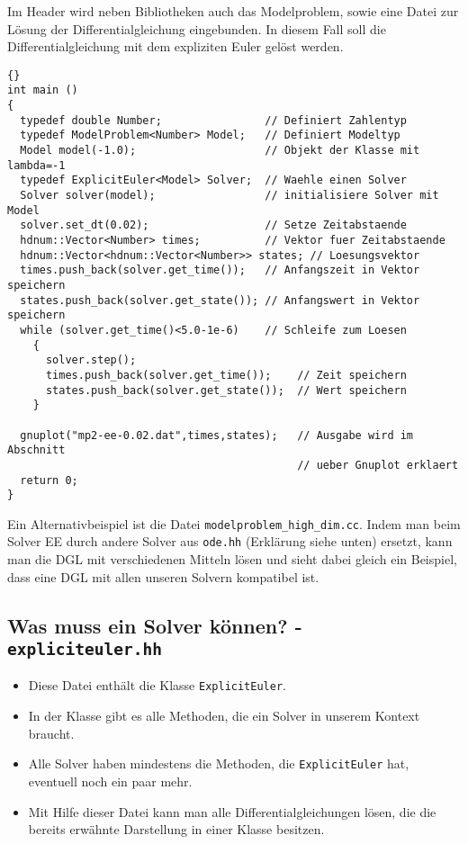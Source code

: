 \documentclass[a4paper,11pt]{article}
\theoremstyle{definition}
\begin{document}
Im Header wird neben Bibliotheken auch das Modelproblem, sowie eine
Datei zur Lösung der Differentialgleichung eingebunden. In diesem Fall
soll die Differentialgleichung mit dem expliziten Euler gelöst werden.

{\footnotesize{\begin{lstlisting}{}
int main ()
{
  typedef double Number;                // Definiert Zahlentyp
  typedef ModelProblem<Number> Model;   // Definiert Modeltyp
  Model model(-1.0);                    // Objekt der Klasse mit lambda=-1
  typedef ExplicitEuler<Model> Solver;  // Waehle einen Solver
  Solver solver(model);                 // initialisiere Solver mit Model
  solver.set_dt(0.02);                  // Setze Zeitabstaende
  hdnum::Vector<Number> times;          // Vektor fuer Zeitabstaende
  hdnum::Vector<hdnum::Vector<Number>> states; // Loesungsvektor
  times.push_back(solver.get_time());   // Anfangszeit in Vektor speichern
  states.push_back(solver.get_state()); // Anfangswert in Vektor speichern
  while (solver.get_time()<5.0-1e-6)    // Schleife zum Loesen
    {
      solver.step();
      times.push_back(solver.get_time());    // Zeit speichern
      states.push_back(solver.get_state());  // Wert speichern
    }

  gnuplot("mp2-ee-0.02.dat",times,states);   // Ausgabe wird im Abschnitt
                                             // ueber Gnuplot erklaert
  return 0;
}
\end{lstlisting}}}

Ein Alternativbeispiel ist die Datei
\lstinline{modelproblem_high_dim.cc}. Indem man beim Solver EE durch
andere Solver aus \lstinline{ode.hh} (Erklärung siehe unten) ersetzt,
kann man die DGL mit verschiedenen Mitteln lösen und sieht dabei
gleich ein Beispiel, dass eine DGL mit allen unseren Solvern
kompatibel ist.

\subsection{Was muss ein Solver können? - \lstinline{expliciteuler.hh}}
\begin{itemize}
\item Diese Datei enthält die Klasse \lstinline{ExplicitEuler}.
\item In der Klasse gibt es alle Methoden, die ein Solver in unserem
  Kontext braucht.
\item Alle Solver haben mindestens die Methoden, die
  \lstinline{ExplicitEuler} hat, eventuell noch ein paar mehr.
\item Mit Hilfe dieser Datei kann man alle Differentialgleichungen
  lösen, die die bereits erwähnte Darstellung in einer Klasse
  besitzen.
\end{itemize}
\end{document}
